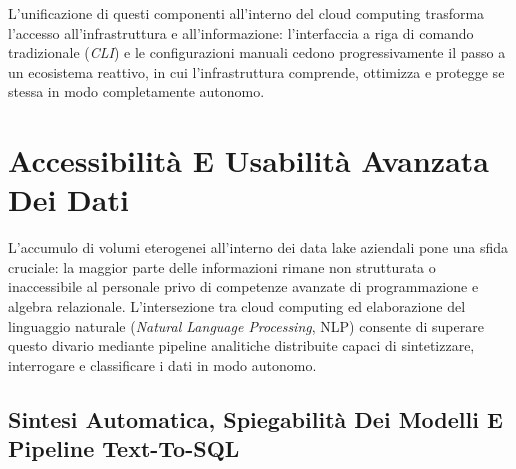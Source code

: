 \documentclass[11pt, a4paper]{article}
\begin{document}
L'unificazione di questi componenti all'interno del cloud computing trasforma l'accesso all'infrastruttura e all'informazione: l'interfaccia a riga di comando tradizionale (\emph{CLI}) e le configurazioni manuali cedono progressivamente il passo a un ecosistema reattivo, in cui l'infrastruttura comprende, ottimizza e protegge se stessa in modo completamente autonomo.


\section{Accessibilità E Usabilità Avanzata Dei Dati}

L'accumulo di volumi eterogenei all'interno dei data lake aziendali pone una sfida cruciale: la maggior parte delle informazioni rimane non strutturata o inaccessibile al personale privo di competenze avanzate di programmazione e algebra relazionale. L'intersezione tra cloud computing ed elaborazione del linguaggio naturale (\emph{Natural Language Processing}, NLP) consente di superare questo divario mediante pipeline analitiche distribuite capaci di sintetizzare, interrogare e classificare i dati in modo autonomo.


\subsection{Sintesi Automatica, Spiegabilità Dei Modelli E Pipeline Text-To-SQL}
\end{document}
